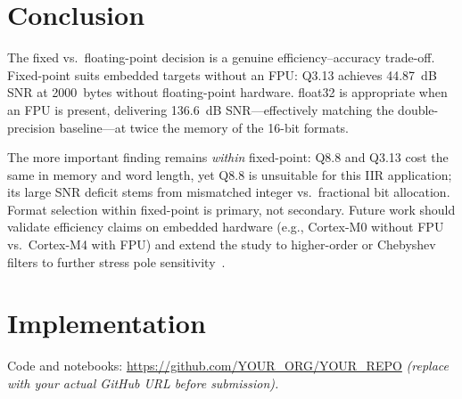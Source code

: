 \documentclass[conference]{IEEEtran}
\begin{document}
\section{Conclusion}
The fixed vs.\ floating-point decision is a genuine efficiency--accuracy trade-off. Fixed-point suits embedded targets without an FPU: Q3.13 achieves 44.87~dB SNR at 2000~bytes without floating-point hardware. float32 is appropriate when an FPU is present, delivering 136.6~dB SNR---effectively matching the double-precision baseline---at twice the memory of the 16-bit formats.

The more important finding remains \emph{within} fixed-point: Q8.8 and Q3.13 cost the same in memory and word length, yet Q8.8 is unsuitable for this IIR application; its large SNR deficit stems from mismatched integer vs.\ fractional bit allocation. Format selection within fixed-point is primary, not secondary. Future work should validate efficiency claims on embedded hardware (e.g., Cortex-M0 without FPU vs.\ Cortex-M4 with FPU) and extend the study to higher-order or Chebyshev filters to further stress pole sensitivity~\cite{smith1997}.

\section*{Implementation}
Code and notebooks: \url{https://github.com/YOUR_ORG/YOUR_REPO} \emph{(replace with your actual GitHub URL before submission).}
\end{document}
